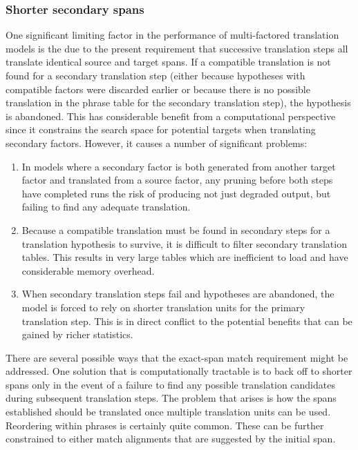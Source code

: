 \documentclass[11pt]{report}
\theoremstyle{plain}
\begin{document}
\subsubsection{Shorter secondary spans}

One significant limiting factor in the performance of multi-factored
translation models is the due to the present requirement that
successive translation steps all translate identical source and
target spans.  If a compatible translation is not found for a
secondary translation step (either because hypotheses with
compatible factors were discarded earlier or because there is no
possible translation in the phrase table for the secondary
translation step), the hypothesis is abandoned. This has
considerable benefit from a computational perspective since it
constrains the search space for potential targets when translating
secondary factors.  However, it causes a number of significant
problems:
\begin{enumerate}
  \item In models where a secondary factor is both generated from another
target factor and translated from a source factor, any pruning
before both steps have completed runs the risk of producing not just
degraded output, but failing to find any adequate translation.
  \item Because a compatible translation must be found in secondary steps
for a translation hypothesis to survive, it is difficult to filter
secondary translation tables.  This results in very large tables
which are inefficient to load and have considerable memory overhead.
  \item When secondary translation steps fail and hypotheses are
abandoned, the model is forced to rely on shorter translation units
for the primary translation step. This is in direct conflict to the
potential benefits that can be gained by richer statistics.
\end{enumerate}

There are several possible ways that the exact-span match
requirement might be addressed. One solution that is computationally
tractable is to back off to shorter spans only in the event of a
failure to find any possible translation candidates during
subsequent translation steps.  The problem that arises is how the
spans established should be translated once multiple translation
units can be used.  Reordering within phrases is certainly quite
common.  These can be further constrained to either match alignments
that are suggested by the initial span.
\end{document}
